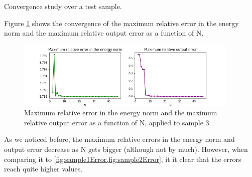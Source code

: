 \documentclass[
	english,
	11pt, %
]{fphw}
\begin{document}
\begin{problem}
	Convergence study over a test sample.
\end{problem}

Figure \cref{fig:sample3Error} shows the convergence of the maximum
relative error in the energy norm and the maximum relative
output error as a function of N.

\begin{figure}[H]
	\centering
	\includegraphics[width=0.95\textwidth]{sample3Error.png}
	\caption{Maximum relative error in the energy norm and the maximum relative output error as a function of N, applied to sample 3.}
	\label{fig:sample3Error}
\end{figure}

As we noticed before, the maximum relative errors in the energy norm and output error decrease as N gets bigger (although not by much). However, when comparing it to \cref{fig:sample1Error,fig:sample2Error}, it it clear that the errors reach quite higher values.


\end{document}

